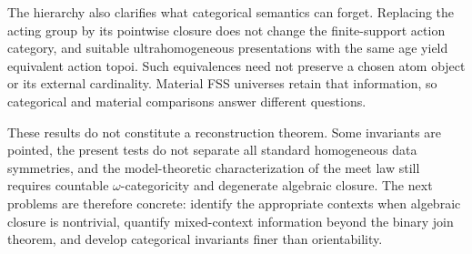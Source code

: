 \documentclass{lmcs}
\begin{document}
The hierarchy also clarifies what categorical semantics can forget.
Replacing the acting group by its pointwise closure does not change the
finite-support action category, and suitable ultrahomogeneous presentations
with the same age yield equivalent action topoi. Such equivalences need not
preserve a chosen atom object or its external cardinality. Material FSS
universes retain that information, so categorical and material comparisons
answer different questions.

These results do not constitute a reconstruction theorem. Some invariants
are pointed, the present tests do not separate all standard homogeneous data
symmetries, and the model-theoretic characterization of the meet law still
requires countable $\omega$-categoricity and degenerate algebraic closure.
The next problems are therefore concrete: identify the appropriate contexts
when algebraic closure is nontrivial, quantify mixed-context information
beyond the binary join theorem, and develop categorical invariants finer than orientability.


\end{document}
